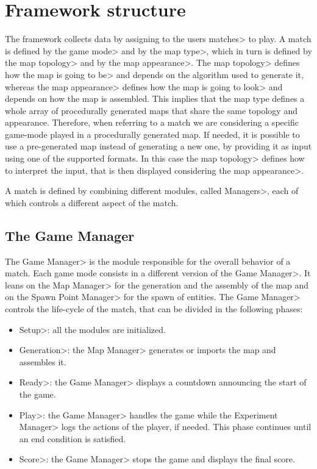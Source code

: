 
\section{Framework structure}

The framework collects data by assigning to the users \<matches> to play. A match is defined by the \<game mode> and by the \<map type>, which in turn is defined by the \<map topology> and by the \<map appearance>. The \<map topology> defines how the map is going to \<be> and depends on the algorithm used to generate it, whereas the \<map appearance> defines how the map is going to \<look> and depends on how the map is assembled. This implies that the map type defines a whole array of procedurally generated maps that share the same topology and appearance. Therefore, when referring to a match we are considering a specific game-mode played in a procedurally generated map. If needed, it is possible to use a pre-generated map instead of generating a new one, by providing it as input using one of the supported formats. In this case the \<map topology> defines how to interpret the input, that is then displayed considering the \<map appearance>.

\par

A match is defined by combining different modules, called \<Managers>, each of which controls a different aspect of the match.


\subsection{The Game Manager}

The \<Game Manager> is the module responsible for the overall behavior of a match. Each game mode consists in a different version of the \<Game Manager>. It leans on the \<Map Manager> for the generation and the assembly of the map and on the \<Spawn Point Manager> for the spawn of entities. The \<Game Manager> controls the life-cycle of the match, that can be divided in the following phases:

\begin{itemize}
\item \<Setup>: all the modules are initialized.
\item \<Generation>: the \<Map Manager> generates or imports the map and assembles it.
\item \<Ready>: the \<Game Manager> displays a countdown announcing the start of the game.
\item \<Play>: the \<Game Manager> handles the game while the \<Experiment Manager> logs the actions of the player, if needed. This phase continues until an end condition is satisfied.
\item \<Score>: the \<Game Manager> stops the game and displays the final score.
\end{itemize}

